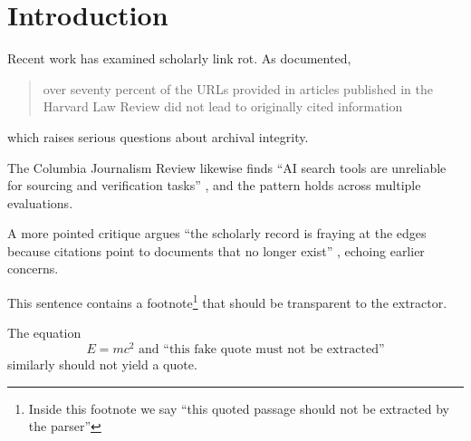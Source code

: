 \documentclass{article}
\begin{document}
\section{Introduction}

Recent work has examined scholarly link rot. As \citet{zittrain2014perma}
documented,
\begin{quote}
over seventy percent of the URLs provided in articles published in the
Harvard Law Review did not lead to originally cited information
\end{quote}
which raises serious questions about archival integrity.

The Columbia Journalism Review likewise finds \enquote{AI search tools
are unreliable for sourcing and verification tasks} \citep{lim2025aisearch},
and the pattern holds across multiple evaluations.

A more pointed critique argues ``the scholarly record is fraying at the
edges because citations point to documents that no longer exist''
\citep{smith2023decay}, echoing earlier concerns.

This sentence contains a footnote\footnote{Inside this footnote we say
``this quoted passage should not be extracted by the parser''} that
should be transparent to the extractor.

The equation
\begin{equation}
E = mc^2 \text{ and ``this fake quote must not be extracted''}
\end{equation}
similarly should not yield a quote.
\end{document}
